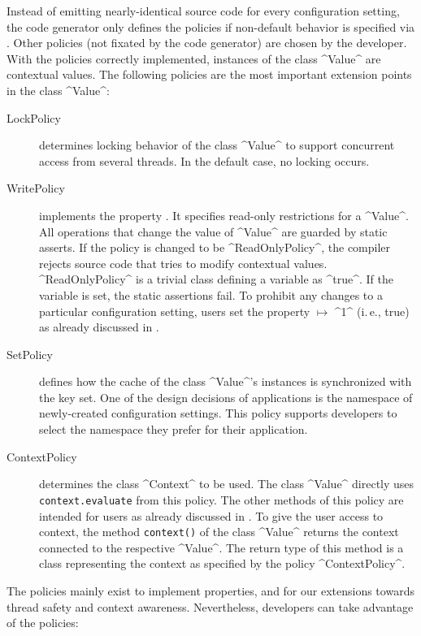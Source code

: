 Instead of emitting nearly-identical source code for every configuration setting, the code generator only defines the policies if non-default behavior is specified via .
Other policies (not fixated by the code generator) are chosen by the developer.
With the policies correctly implemented, instances of the class ^Value^ are contextual values.
The following policies are the most important extension points in the class ^Value^:


\begin{description}
\item[LockPolicy] determines locking behavior of the class ^Value^ to support concurrent access from several threads.
In the default case, no locking occurs.
\item[WritePolicy] implements the property .
It specifies read-only restrictions for a ^Value^.
All operations that change the value of ^Value^ are guarded by static asserts.
If the policy is changed to be ^ReadOnlyPolicy^, the compiler rejects source code that tries to modify contextual values.
^ReadOnlyPolicy^ is a trivial class defining a variable as ^true^.
If the variable is set, the static assertions fail.
To prohibit any changes to a particular configuration setting, users set the property  $\mapsto$ ^1^ (i.\,e., true) as already discussed in .
\item[SetPolicy] defines how the cache of the class ^Value^'s instances is synchronized with the key set.
One of the design decisions of applications is the namespace of newly-created configuration settings.
This policy supports developers to select the namespace they prefer for their application.
\item[ContextPolicy] determines the class ^Context^ to be used.
The class ^Value^ directly uses \texttt{context.evaluate} from this policy.
The other methods of this policy are intended for users as already discussed in .
To give the user access to context, the method \texttt{context()} of the class ^Value^ returns the context connected to the respective ^Value^.
The return type of this method is a class representing the context as specified by the policy ^ContextPolicy^.
\end{description}

The policies mainly exist to implement properties, and for our extensions towards thread safety and context awareness.
Nevertheless, developers can take advantage of the policies:

